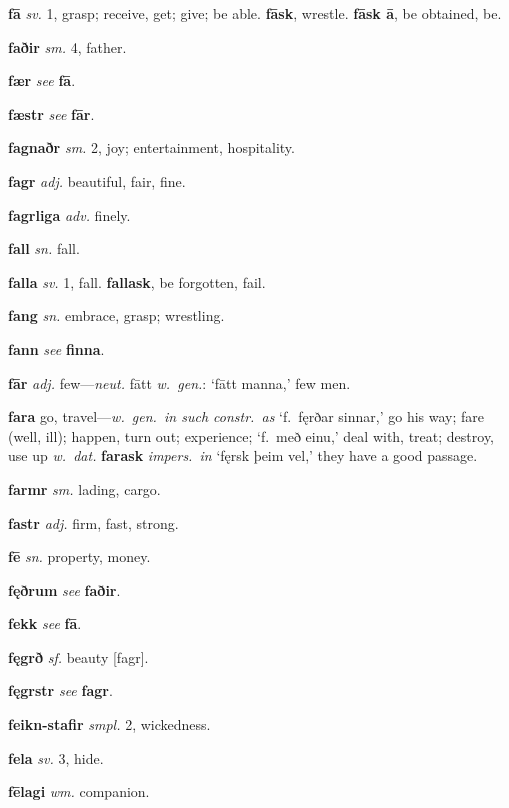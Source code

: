 \documentclass[12pt,letterpaper]{book}
\begin{document}
\noindent
\textbf{fā} \textit{sv.} 1, grasp; receive, get; give; be able.
	\textbf{fāsk}, wrestle.  \textbf{fāsk ā}, be obtained, be.

\noindent
\textbf{faðir} \textit{sm.} 4, father.

\noindent
\textbf{fær} \textit{} \textit{see} \textbf{fā}.

\noindent
\textbf{fæstr} \textit{} \textit{see} \textbf{fār}.

\noindent
\textbf{fagnaðr} \textit{sm.} 2, joy; entertainment, hospitality.

\noindent
\textbf{fagr} \textit{adj.} beautiful, fair, fine.

\noindent
\textbf{fagrliga} \textit{adv.} finely.

\noindent
\textbf{fall} \textit{sn.} fall.

\noindent
\textbf{falla} \textit{sv.} 1, fall.  \textbf{fallask}, be forgotten,
	fail.

\noindent
\textbf{fang} \textit{sn.} embrace, grasp; wrestling.

\noindent
\textbf{fann} \textit{} \textit{see} \textbf{finna}.

\noindent
\textbf{fār} \textit{adj.} few---\textit{neut.} fātt \textit{w.\ gen.}:
	`fātt manna,' few men.

\noindent
\textbf{fara} \textit{} go, travel---\textit{w.\ gen.\ in such constr.\ as}
	`f.\ fęrðar sinnar,' go his way; fare (well, ill); happen, turn out;
    experience; `f.\ með einu,' deal with, treat; destroy, use
    up \textit{w.\ dat.}  \textbf{farask} \textit{impers.\ in} `fęrsk þeim vel,'
	they have a good passage.

\noindent
\textbf{farmr} \textit{sm.} lading, cargo.

\noindent
\textbf{fastr} \textit{adj.} firm, fast, strong.

\noindent
\textbf{fē} \textit{sn.} property, money.

\noindent
\textbf{fęðrum} \textit{} \textit{see} \textbf{faðir}.

\noindent
\textbf{fekk} \textit{} \textit{see} \textbf{fā}.

\noindent
\textbf{fęgrð} \textit{sf.} beauty [fagr].

\noindent
\textbf{fęgrstr} \textit{} \textit{see} \textbf{fagr}.

\noindent
\textbf{feikn-stafir} \textit{smpl.} 2, wickedness.

\noindent
\textbf{fela} \textit{sv.} 3, hide.

\noindent
\textbf{fēlagi} \textit{wm.} companion.
\end{document}
